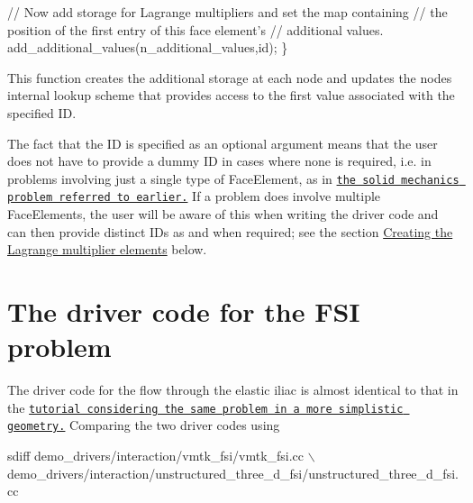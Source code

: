 \begin{DoxyCodeInclude}
   
   \textcolor{comment}{// Now add storage for Lagrange multipliers and set the map containing }
   \textcolor{comment}{// the position of the first entry of this face element's }
   \textcolor{comment}{// additional values.}
   add\_additional\_values(n\_additional\_values,\textcolor{keywordtype}{id});
  \}

\end{DoxyCodeInclude}


This function creates the additional storage at each node and updates the node\textquotesingle{}s internal lookup scheme that provides access to the first value associated with the specified ID.

The fact that the ID is specified as an optional argument means that the user does not have to provide a dummy ID in cases where none is required, i.\+e. in problems involving just a single type of {\ttfamily Face\+Element}, as in \href{../../../solid/prescribed_displ_lagr_mult/html/index.html}{\tt the solid mechanics problem referred to earlier.} If a problem does involve multiple {\ttfamily Face\+Elements}, the user will be aware of this when writing the driver code and can then provide distinct I\+Ds as and when required; see the section \hyperlink{index_face_elements_code}{Creating the Lagrange multiplier elements} below.



 

\hypertarget{index_driver_code}{}\section{The driver code for the F\+S\+I problem}\label{index_driver_code}
The driver code for the flow through the elastic iliac is almost identical to that in the \href{../../unstructured_three_d_fsi/html/index.html}{\tt tutorial considering the same problem in a more simplistic geometry.} Comparing the two driver codes using


\begin{DoxyCode}
sdiff demo\_drivers/interaction/vmtk\_fsi/vmtk\_fsi.cc \(\backslash\)
      demo\_drivers/interaction/unstructured\_three\_d\_fsi/unstructured\_three\_d\_fsi.cc
\end{DoxyCode}


